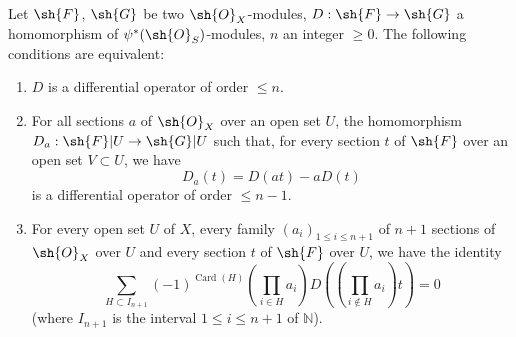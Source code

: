 \begin{proposition}[16.8.8]
\label{IV.16.8.8}
Let $\sh{F}$, $\sh{G}$ be two $\sh{O}_X$-modules, $D: \sh{F} \to \sh{G}$ a homomorphism of $\psi^*(\sh{O}_S)$-modules, $n$ an integer $\geq 0$.
The following conditions are equivalent:
\begin{enumerate}
  \item[(a)] $D$ is a differential operator of order $\leq n$.
  \item[(b)] For all sections $a$ of $\sh{O}_X$ over an open set $U$, the homomorphism $D_a: \sh{F}|U \to \sh{G}|U$ such that, for every section $t$ of $\sh{F}$ over an open set $V \subset U$, we have
  \[  
    \label{IV.16.8.8.1}
    D_a(t) = D(at) - a D(t)
    \tag{16.8.8.1}
  \]
  is a differential operator of order $\leq n-1$.
  \item[(c)] For every open set $U$ of $X$, every family $(a_i)_{1 \leq i \leq n+1}$ of $n+1$ sections of $\sh{O}_X$ over $U$ and every section $t$ of $\sh{F}$ over $U$, we have the identity
  \[
    \label{IV.16.8.8.2}
    \sum_{H \subset I_{n+1}} (-1)^{\operatorname{Card}(H)} (\prod_{i \in H} a_i) D ((\prod_{i \notin H} a_i ) t ) = 0
    \tag{16.8.8.2}
  \]
  (where $I_{n+1}$ is the interval $1 \leq i \leq n+1$ of $\mathbb{N}$).
\end{enumerate}
\end{proposition}

